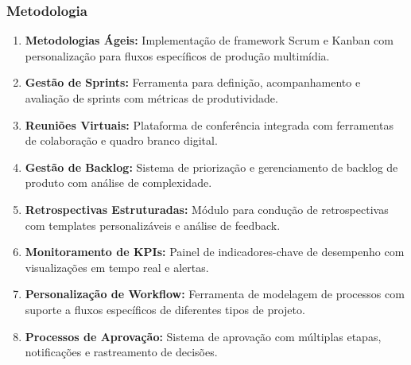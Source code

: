 \subsubsection{Metodologia}
\begin{enumerate}[leftmargin=*]
    \item \textbf{Metodologias Ágeis:} Implementação de framework Scrum e Kanban com personalização para fluxos específicos de produção multimídia.
    \item \textbf{Gestão de Sprints:} Ferramenta para definição, acompanhamento e avaliação de sprints com métricas de produtividade.
    \item \textbf{Reuniões Virtuais:} Plataforma de conferência integrada com ferramentas de colaboração e quadro branco digital.
    \item \textbf{Gestão de Backlog:} Sistema de priorização e gerenciamento de backlog de produto com análise de complexidade.
    \item \textbf{Retrospectivas Estruturadas:} Módulo para condução de retrospectivas com templates personalizáveis e análise de feedback.
    \item \textbf{Monitoramento de KPIs:} Painel de indicadores-chave de desempenho com visualizações em tempo real e alertas.
    \item \textbf{Personalização de Workflow:} Ferramenta de modelagem de processos com suporte a fluxos específicos de diferentes tipos de projeto.
    \item \textbf{Processos de Aprovação:} Sistema de aprovação com múltiplas etapas, notificações e rastreamento de decisões.
\end{enumerate}

